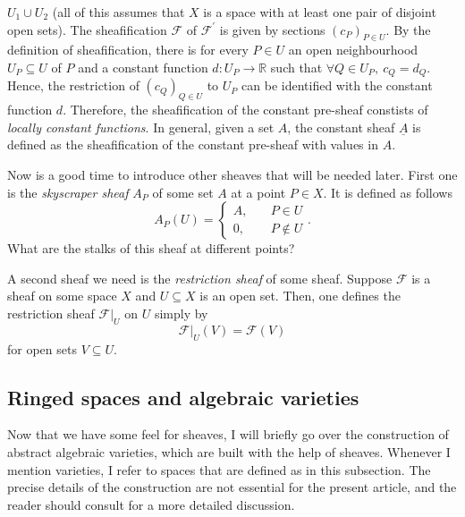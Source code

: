$U_{1}\cup U_{2}$ (all of this assumes that $X$ is a space with
at least one pair of disjoint open sets). The sheafification $\mathscr{F}$ of
$\mathscr{F}^{\prime}$ is given by sections $(c_{P})_{P\in U}$. By the
definition of sheafification, there is for every $P\in U$ an open
neighbourhood $U_{P}\subseteq U$ of $P$ and a constant function
$d: U_{P}\to\mathbb{R}$ such that $\forall Q\in U_{P},\ c_{Q}=d_{Q}$.
Hence, the restriction of $(c_{Q})_{Q\in U}$ to $U_{P}$ can be identified
with the constant function $d$. Therefore, the sheafification of the constant
pre-sheaf constists of \emph{locally constant functions}. In general, given
a set $A$, the constant sheaf $\underline{A}$ is defined as the sheafification
of the constant pre-sheaf with values in $A$.

Now is a good time to introduce other sheaves that will be needed later.
First one is the \emph{skyscraper sheaf} $A_P$ of some set $A$ at a point $P\in X$.
It is defined as follows
\[
  A_{P}(U)=\begin{cases}
    A, & \quad P\in U \\
    0, & \quad P\not\in U
  \end{cases}.
\]
What are the stalks of this sheaf at different points?

A second sheaf we need is the \emph{restriction sheaf} of some sheaf.
Suppose $\mathscr{F}$ is a sheaf on some space $X$ and $U\subseteq X$ is
an open set. Then, one defines the restriction sheaf $\mathscr{F}\vert_{U}$
on $U$ simply by
\[
  \mathscr{F}\vert_{U}(V)=\mathscr{F}(V)
\]
for open sets $V\subseteq U$.

\subsection{Ringed spaces and algebraic varieties}
Now that we have some feel for sheaves, I will briefly go over the
construction of abstract algebraic varieties, which are built with the help
of sheaves. Whenever I mention varieties, I refer to spaces that are
defined as in this subsection. The precise details of the construction are not
essential for the present article, and the reader should consult
\cite{gathmann} for a more detailed discussion.

